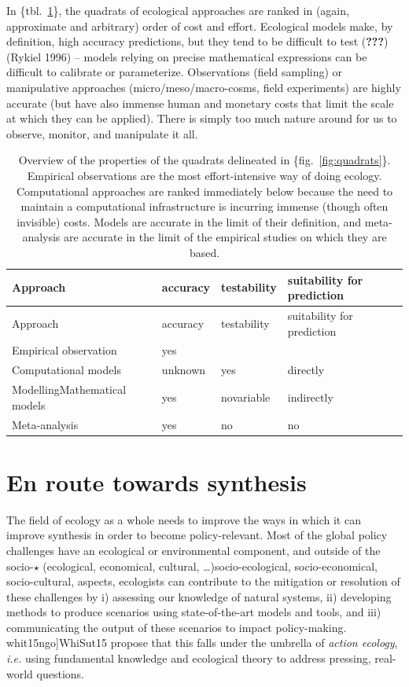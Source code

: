 \documentclass[11pt,serif]{article}
\begin{document}
In \{tbl.~\ref{tbl:costbenefit}\}, the quadrats of ecological approaches
are ranked in (again, approximate and arbitrary) order of cost and
effort. Ecological models make, by definition, high accuracy
predictions, but they tend to be difficult to test
\color{gray}({\textbf{???}})\color{black}\color{purple}(Rykiel
1996)\color{black} -- models relying on precise mathematical expressions
can be difficult to calibrate or parameterize. Observations (field
sampling) or manipulative approaches (micro/meso/macro-cosms, field
experiments) are highly accurate (but have also immense human and
monetary costs that limit the scale at which they can be applied). There
is simply too much nature around for us to observe, monitor, and
manipulate it all.

\hypertarget{tbl:costbenefit}{}
\begin{longtable}[]{@{}llll@{}}
\caption{\label{tbl:costbenefit}Overview of the properties of the
quadrats delineated in \{fig.~\ref{fig:quadrats}\}. Empirical
observations are the most effort-intensive way of doing ecology.
Computational approaches are ranked immediately below because the need
to maintain a computational infrastructure is incurring immense (though
often invisible) costs. Models are accurate in the limit of their
definition, and meta-analysis are accurate in the limit of the empirical
studies on which they are based.}\tabularnewline
\toprule
Approach & accuracy & testability & suitability for
prediction\tabularnewline
\midrule
\endfirsthead
\toprule
Approach & accuracy & testability & suitability for
prediction\tabularnewline
\midrule
\endhead
Empirical observation & yes & &\tabularnewline
Computational \color{purple}models\color{black} & unknown & yes &
directly\tabularnewline
\color{gray}Modelling\color{black}\color{purple}Mathematical
models\color{black} & yes &
\color{gray}no\color{black}\color{purple}variable\color{black} &
indirectly\tabularnewline
Meta-analysis & yes & no & no\tabularnewline
\bottomrule
\end{longtable}

\section{En route towards synthesis}\label{en-route-towards-synthesis}

The field of ecology as a whole needs to improve the ways in which it
can improve synthesis in order to become policy-relevant. Most of the
global policy challenges have an ecological or environmental component,
and outside of the \color{gray}socio-\(\star\) (ecological, economical,
cultural, \ldots{})\color{black}\color{purple}socio-ecological,
socio-economical, socio-cultural,\color{black} aspects, ecologists can
contribute to the mitigation or resolution of these challenges by i)
assessing our knowledge of natural systems, ii) developing methods to
produce scenarios using state-of-the-art models and tools, and iii)
communicating the output of these scenarios to impact policy-making.
\color{gray}{[}whit15ngo{]}\color{black}\color{purple}WhiSut15\color{black}
propose that this falls under the umbrella of \emph{action ecology},
\emph{i.e.} using fundamental knowledge and ecological theory to address
pressing, real-world questions.
\end{document}
